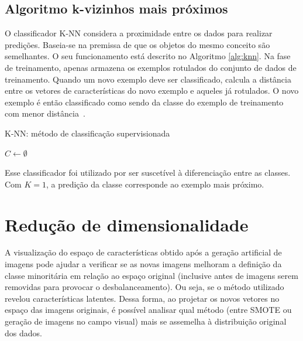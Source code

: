 \subsection{Algoritmo k-vizinhos mais próximos}
\label{sec:knn}

O classificador K-NN considera a proximidade entre os dados para realizar predições. Baseia-se na premissa de que os objetos do mesmo conceito são semelhantes. O seu funcionamento está descrito no Algoritmo \ref{alg:knn}. Na fase de treinamento, apenas armazena os exemplos rotulados do conjunto de dados de treinamento. Quando um novo exemplo deve ser classificado, calcula a distância entre os vetores de características do novo exemplo e aqueles já rotulados. O novo exemplo é então classificado como sendo da classe do exemplo de treinamento com menor distância~\cite{Boiman2008}.

\begin{algorithm}[!htbp]
  \caption{K-NN: método de classificação supervisionada}
  \label{alg:knn}
  \SetAlgoLined
  $C \gets \emptyset $\;
\end{algorithm}


Esse classificador foi utilizado por ser suscetível à diferenciação entre as classes. Com $K = 1$, a predição da classe corresponde ao exemplo mais próximo.
\section{Redução de dimensionalidade}
\label{sec:vis}

A visualização do espaço de características obtido após a geração artificial de imagens pode ajudar a verificar se as novas imagens melhoram a definição da classe minoritária em relação ao espaço original (inclusive antes de imagens serem removidas para provocar o desbalanceamento). Ou seja, se o método utilizado revelou características latentes. Dessa forma, ao projetar os novos vetores no espaço das imagens originais, é possível analisar qual método (entre SMOTE ou geração de imagens no campo visual) mais se assemelha à distribuição original dos dados.

